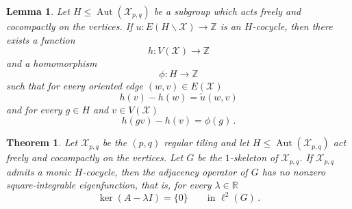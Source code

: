 \documentclass[10pt,a4paper]{amsart}
\newtheorem{theorem}{Theorem}
\newtheorem{lemma}{Lemma}
\newcommand{\Aut}{\operatorname{Aut}}
\newcommand{\R}{\mathbb R}
\newcommand{\Z}{\mathbb Z}
\newcommand{\cX}{\mathcal X}
\newcommand{\elltwo}{\ell^2}
\begin{document}
\begin{lemma}\label{lem:height} Let $H\leq \Aut(\cX_{p,q})$ be a subgroup which acts freely and cocompactly on the vertices. If $u:E(H\backslash \cX)\to \Z$ is an $H$-cocycle, then there exists a function
\[
h:V(\mathcal X) \longrightarrow\Z
\]
and a homomorphism
\[
\phi:H\longrightarrow\Z
\]
such that for every oriented edge $(w,v)\in E(\mathcal X)$
\[
h(v)-h(w)=\tilde{u}(w,v)
\]
and for every $g\in H$ and $v\in V(\cX)$ 
\[
h(gv)-h(v)=\phi(g) \, .
\]
\end{lemma}

\begin{theorem}\label{thm:criterion}
Let $\mathcal X_{p,q}$ be the $(p,q)$ regular tiling and let $H\leq\Aut(\mathcal X_{p,q})$ act freely and cocompactly on the vertices. Let $G$ be the $1$-skeleton of $\mathcal X_{p,q}$. If $\mathcal X_{p,q}$ admits a monic $H$-cocycle, then the adjacency operator of $G$ has no nonzero square-integrable eigenfunction, that is, for every $\lambda\in\R$
\[
\ker(A-\lambda I)=\{0\}
\qquad\text{in }\elltwo(G) \, .
\]
\end{theorem}
\end{document}
